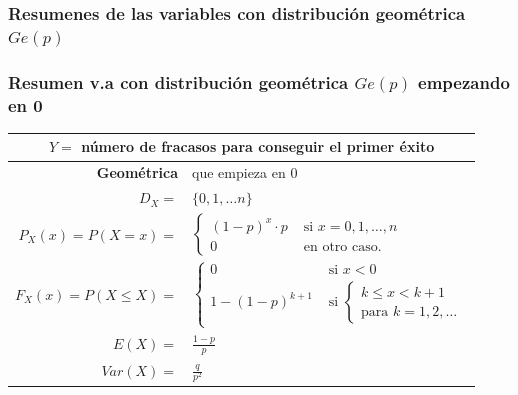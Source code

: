 \documentclass[handout]{beamer}\usepackage[]{graphicx}\usepackage[]{color}
\renewcommand{\leq}{\leqslant}
\theoremstyle{plain}
\theoremstyle{definition}
\begin{document}
\subsubsection{Resumenes de las variables con  distribución geométrica $Ge(p)$}
\begin{frame}

\frametitle{Resumen v.a con distribución geométrica $Ge(p)$ empezando en 0}
\scriptsize
\setlength{\tabcolsep}{1pt}
\begin{table}
\centering
\begin{tabular}{|rl|}
\hline 
\multicolumn{2}{|c|}{$Y=$ número de fracasos  para conseguir el primer éxito}\\ 
\hline
\hline
\textbf{Geométrica} &  que empieza en 0\\
\hline \hline 
$D_X=$&  $\{0,1,\ldots n\}$ \\\hline 
$P_X(x)=P(X=x)=$ & 
$\left\{
\begin{array}{ll}
  (1-p)^{x}\cdot p & \mbox{ si } x=0,1,\ldots,n\\
     0  & \mbox{ en otro caso.}
     \end{array}\right.$
\\ \hline 
$F_X(x)=P(X\leq X)=$ & $\left\{\begin{array}{ll} 0 & \mbox{ si } x<0\\
  1- (1-p)^{k+1} & \mbox{ si } \left\{ \begin{array}{l}k\leq x< k+1\\\mbox{para } k=1,2,\ldots\end{array}
    \right.\end{array}\right.$ \\\hline 
$E(X)=$ &  $\frac{1-p}{p}$ \\
$Var(X)=$ & $\frac{q}{p^2}$\\
\hline
\end{tabular}
\end{table}
\normalsize

\end{frame}
\end{document}
